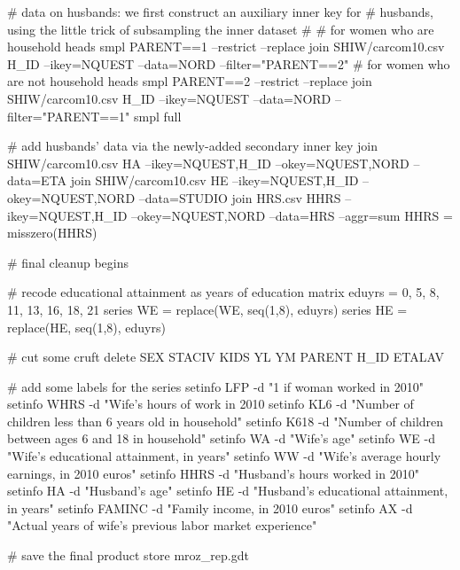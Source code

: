 \begin{code}
# data on husbands: we first construct an auxiliary inner key for 
# husbands, using the little trick of subsampling the inner dataset
#
# for women who are household heads
smpl PARENT==1 --restrict --replace
join SHIW/carcom10.csv H_ID --ikey=NQUEST --data=NORD --filter="PARENT==2"
# for women who are not household heads
smpl PARENT==2 --restrict --replace
join SHIW/carcom10.csv H_ID --ikey=NQUEST --data=NORD --filter="PARENT==1"
smpl full

# add husbands' data via the newly-added secondary inner key
join SHIW/carcom10.csv HA --ikey=NQUEST,H_ID --okey=NQUEST,NORD --data=ETA
join SHIW/carcom10.csv HE --ikey=NQUEST,H_ID --okey=NQUEST,NORD --data=STUDIO
join HRS.csv HHRS --ikey=NQUEST,H_ID --okey=NQUEST,NORD --data=HRS --aggr=sum
HHRS = misszero(HHRS)

# final cleanup begins

# recode educational attainment as years of education
matrix eduyrs = {0, 5, 8, 11, 13, 16, 18, 21}
series WE = replace(WE, seq(1,8), eduyrs)
series HE = replace(HE, seq(1,8), eduyrs)

# cut some cruft
delete SEX STACIV KIDS YL YM PARENT H_ID ETALAV

# add some labels for the series
setinfo LFP -d "1 if woman worked in 2010"
setinfo WHRS -d "Wife's hours of work in 2010
setinfo KL6 -d "Number of children less than 6 years old in household"
setinfo K618 -d "Number of children between ages 6 and 18 in household"
setinfo WA -d "Wife's age"
setinfo WE -d "Wife's educational attainment, in years"
setinfo WW -d "Wife's average hourly earnings, in 2010 euros"
setinfo HHRS -d "Husband's hours worked in 2010"
setinfo HA -d "Husband's age"
setinfo HE -d "Husband's educational attainment, in years"
setinfo FAMINC -d "Family income, in 2010 euros"
setinfo AX -d "Actual years of wife's previous labor market experience"

# save the final product
store mroz_rep.gdt
\end{code}


